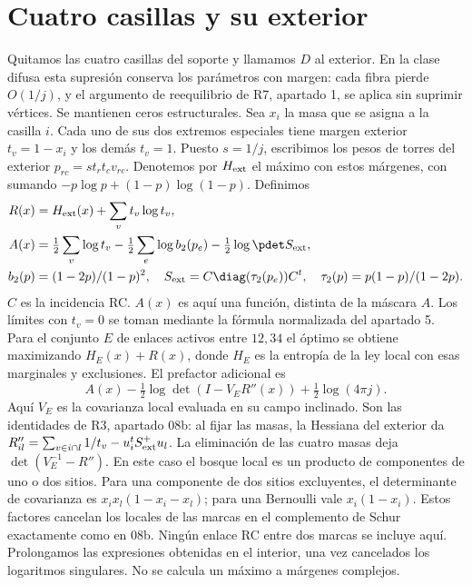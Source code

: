 \section{Cuatro casillas y su exterior}
Quitamos las cuatro casillas del soporte y llamamos $D$ al exterior.
En la clase difusa esta supresión conserva los parámetros con margen: cada fibra pierde
$O(1/j)$, y el argumento de reequilibrio de R7, apartado 1, se aplica sin suprimir vértices.
Se mantienen ceros estructurales. Sea $x_i$ la masa que se asigna a la casilla $i$.
Cada uno de sus dos extremos especiales tiene margen exterior $t_v=1-x_i$ y los demás $t_v=1$.
Puesto $s=1/j$, escribimos los pesos de torres del exterior $p_{rc}=s t_rt_c v_{rc}$.
Denotemos por $H_{\rm ext}$ el máximo con estos márgenes, con sumando
$-p\log p+(1-p)\log(1-p)$. Definimos
\begin{align*}
 R(x)&=H_{\rm ext}(x)+\sum_v t_v\log t_v,\\
 A(x)&=\tfrac12\sum_v\log t_v-\tfrac12\sum_e\log b_2(p_e)
                     -\tfrac12\log\pdet S_{\rm ext},\\
 b_2(p)&=(1-2p)/(1-p)^2,\quad
 S_{\rm ext}=C\diag(\tau_2(p_e))C^t,\quad \tau_2(p)=p(1-p)/(1-2p).
\end{align*}
$C$ es la incidencia RC. $A(x)$ es aquí una función, distinta de la máscara $A$.
Los límites con $t_v=0$ se toman mediante la fórmula normalizada del apartado 5.
Para el conjunto $E$ de enlaces activos entre $12,34$ el óptimo se obtiene maximizando
$H_E(x)+R(x)$, donde $H_E$ es la entropía de la ley local con esas marginales
y exclusiones. El prefactor adicional es
\[
 A(x)-\tfrac12\log\det(I-V_E R''(x))+\tfrac12\log(4\pi j).
\]
Aquí $V_E$ es la covarianza local evaluada en su campo inclinado. Son las identidades
de R3, apartado 08b: al fijar las masas, la Hessiana del exterior da
$R''_{il}=\sum_{v\in i\cap l}1/t_v-u_i^t S_{\rm ext}^+u_l$.
La eliminación de las cuatro masas deja $\det(V_E^{-1}-R'')$.
En este caso el bosque local es un producto de componentes de uno o dos sitios.
Para una componente de dos sitios excluyentes, el determinante de covarianza es
$x_i x_l(1-x_i-x_l)$; para una Bernoulli vale $x_i(1-x_i)$.
Estos factores cancelan los locales de las marcas en el complemento de Schur
exactamente como en 08b. Ningún enlace RC entre dos marcas se incluye aquí.
Prolongamos las expresiones obtenidas en el interior, una vez cancelados los logaritmos
singulares. No se calcula un máximo a márgenes complejos.
